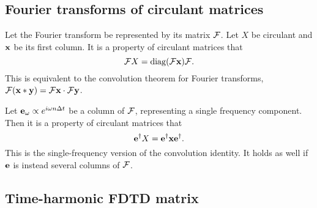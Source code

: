 \subsection{Fourier transforms of circulant matrices}

Let the Fourier transform be represented by its matrix $\mathcal{F}$.  Let $X$ be circulant and $\textbf{x}$ be its first column.  It is a property of circulant matrices that
%
\begin{equation}
\mathcal{F} X = \operatorname{diag}( \mathcal{F} \textbf{x} ) \mathcal{F}.
\end{equation}
%
This is equivalent to the convolution theorem for Fourier transforms, $\mathcal{F} (\textbf{x} \ast \textbf{y}) = \mathcal{F} \textbf{x} \cdot \mathcal{F} \textbf{y}$.

Let $\textbf{e}_\omega \propto e^{i \omega n \Delta t}$ be a column of $\mathcal{F}$, representing a single frequency component.  Then it is a property of circulant matrices that
%
\begin{equation}
\textbf{e}^\dagger X = \textbf{e}^\dagger \textbf{x} \textbf{e}^\dagger.
\label{eqn:singleFrequencyCirculant}
\end{equation}
%
This is the single-frequency version of the convolution identity.  It holds as well if $\textbf{e}$ is instead several columns of $\mathcal{F}$.

\subsection{Time-harmonic FDTD matrix}

